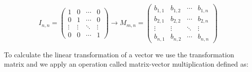 \begin{equation}I_{n, n} = \begin{pmatrix}
  1 & 0 & \cdots & 0 \\
  0 & 1 & \cdots & 0 \\
  \vdots  & \vdots  & \ddots & \vdots  \\
  0 & 0 & \cdots & 1
 \end{pmatrix} \rightarrow M_{m,n} = \begin{pmatrix}
  b_{1,1} & b_{1,2} & \cdots & b_{1,n} \\
  b_{2,1} & b_{2,2} & \cdots & b_{2,n} \\
  \vdots  & \vdots  & \ddots & \vdots  \\
  b_{n,1} & b_{n,2} & \cdots & b_{n,n}
 \end{pmatrix} \tag{II.1}\end{equation}

To calculate the linear transformation of a vector we use the transformation matrix and we apply an operation called matrix-vector multiplication defined as:

